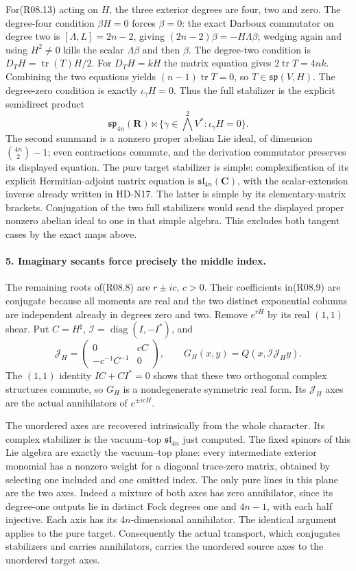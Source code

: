 For(R08.13) acting on $H$, the three exterior degrees are
four, two and zero. The degree-four condition $\beta H=0$
forces $\beta=0$: the exact Darboux commutator on degree two
is $[\Lambda,L]=2n-2$, giving
$(2n-2)\beta=-H\Lambda\beta$; wedging again and using
$H^2\ne0$ kills the scalar $\Lambda\beta$ and then $\beta$.
The degree-two condition is
$D_TH=\operatorname{tr}(T)H/2$. For $D_TH=kH$ the
matrix equation gives $2\operatorname{tr}T=4nk$.
Combining the two equations yields
$(n-1)\operatorname{tr}T=0$, so $T\in\mathfrak{sp}(V,H)$.
The degree-zero condition is exactly $\iota_\gamma H=0$.
Thus the full stabilizer is the explicit semidirect product
\[
 \mathfrak{sp}_{4n}(\mathbf R)\ltimes
       \{\gamma\in\bigwedge^2V^*:\iota_\gamma H=0\}.          \tag{R08.16}
\]
The second summand is a nonzero proper abelian Lie ideal,
of dimension $\binom{4n}{2}-1$; even contractions commute,
and the derivation commutator preserves its displayed equation.
The pure target stabilizer is simple: complexification of its
explicit Hermitian-adjoint matrix equation is
$\mathfrak{sl}_{4n}(\mathbf C)$, with the scalar-extension
inverse already written in HD-N17. The latter is simple by
its elementary-matrix brackets. Conjugation of the two full
stabilizers would send the displayed proper nonzero abelian
ideal to one in that simple algebra. This excludes both
tangent cases by the exact maps above.

\paragraph{5. Imaginary secants force precisely the middle index.}
The remaining roots of(R08.8) are $r\pm ic$, $c>0$.
Their coefficients in(R08.9) are conjugate because all
moments are real and the two distinct exponential columns
are independent already in degrees zero and two. Remove
$e^{rH}$ by its real $(1,1)$ shear. Put $C=H^\sharp$,
$\mathcal I=\operatorname{diag}(I,-I^*)$, and
\[
    \mathcal J_H=\begin{pmatrix}0&cC\\-c^{-1}C^{-1}&0\end{pmatrix},
        \qquad G_H(x,y)=Q(x,\mathcal I\mathcal J_Hy).         \tag{R08.17}
\]
The $(1,1)$ identity $IC+CI^*=0$ shows that these two
orthogonal complex structures commute, so $G_H$ is a
nondegenerate symmetric real form. Its $\mathcal J_H$ axes
are the actual annihilators of $e^{\pm icH}$.

The unordered axes are recovered intrinsically from the whole
character. Its complex stabilizer is the vacuum--top
$\mathfrak{sl}_{4n}$ just computed. The fixed spinors of this
Lie algebra are exactly the vacuum--top plane: every intermediate
exterior monomial has a nonzero weight for a diagonal trace-zero
matrix, obtained by selecting one included and one omitted
index. The only pure lines in this plane are the two axes.
Indeed a mixture of both axes has zero annihilator, since its
degree-one outputs lie in distinct Fock degrees one and $4n-1$,
with each half injective. Each axis has its $4n$-dimensional
annihilator. The identical argument applies to the pure target.
Consequently the actual transport, which conjugates stabilizers
and carries annihilators, carries the unordered source axes
to the unordered target axes.

